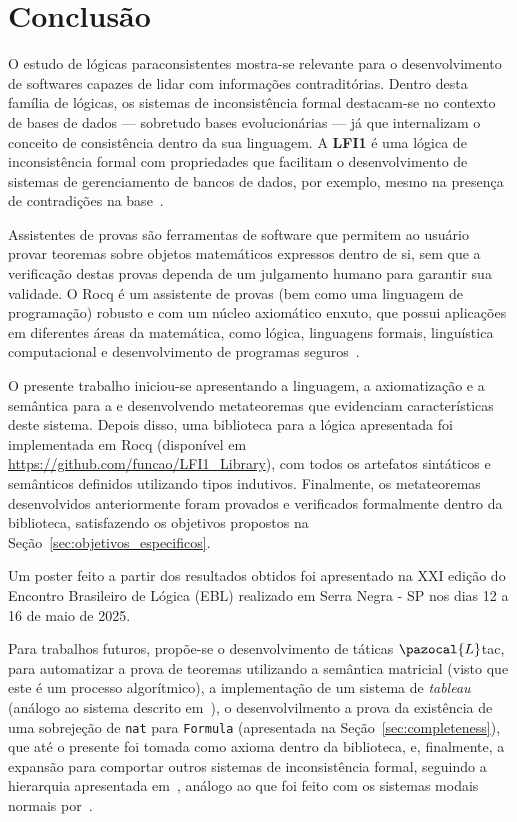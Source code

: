 \chapter{Conclusão}\label{chap:conclusao}

O estudo de lógicas paraconsistentes mostra-se relevante para o desenvolvimento de softwares capazes de lidar com informações contraditórias. Dentro desta família de lógicas, os sistemas de inconsistência formal destacam-se no contexto de bases de dados {---} sobretudo bases evolucionárias {---} já que internalizam o conceito de consistência dentro da sua linguagem. A \textbf{LFI1} é uma lógica de inconsistência formal com propriedades que facilitam o desenvolvimento de sistemas de gerenciamento de bancos de dados, por exemplo, mesmo na presença de contradições na base~\cite{carnielli2000formal}.

Assistentes de provas são ferramentas de software que permitem ao usuário provar teoremas sobre objetos matemáticos expressos dentro de si, sem que a verificação destas provas dependa de um julgamento humano para garantir sua validade. O Rocq é um assistente de provas (bem como uma linguagem de programação) robusto e com um núcleo axiomático enxuto, que possui aplicações em diferentes áreas da matemática, como lógica, linguagens formais, linguística computacional e desenvolvimento de programas seguros~\cite{coqart}.

O presente trabalho iniciou-se apresentando a linguagem, a axiomatização e a semântica para a \lfium{} e desenvolvendo metateoremas que evidenciam características deste sistema. Depois disso, uma biblioteca para a lógica apresentada foi implementada em Rocq (disponível em \url{https://github.com/funcao/LFI1_Library}), com todos os artefatos sintáticos e semânticos definidos utilizando tipos indutivos. Finalmente, os metateoremas desenvolvidos anteriormente foram provados e verificados formalmente dentro da biblioteca, satisfazendo os objetivos propostos na Seção~\ref{sec:objetivos_especificos}.

Um poster feito a partir dos resultados obtidos foi apresentado na XXI edição do Encontro Brasileiro de Lógica (EBL) realizado em Serra Negra {-} SP nos dias 12 a 16 de maio de 2025.

Para trabalhos futuros, propõe-se o desenvolvimento de táticas $\pazocal{L}$tac, para automatizar a prova de teoremas utilizando a semântica matricial (visto que este é um processo algorítmico), a implementação de um sistema de \textit{tableau} (análogo ao sistema descrito em~\cite{tableaulfi}), o desenvolvilmento a prova da existência de uma sobrejeção de \texttt{nat} para \texttt{Formula} (apresentada na Seção~\ref{sec:completeness}), que até o presente foi tomada como axioma dentro da biblioteca, e, finalmente, a expansão para comportar outros sistemas de inconsistência formal, seguindo a hierarquia apresentada em~\cite{Carnielli_Coniglio_2016}, análogo ao que foi feito com os sistemas modais normais por~.